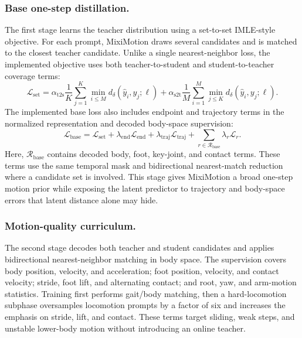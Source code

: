 \documentclass[runningheads]{llncs}
\begin{document}
\subsubsection{Base one-step distillation.}
The first stage learns the teacher distribution using a set-to-set IMLE-style
objective. For each prompt, MixiMotion draws several candidates and is matched
to the closest teacher candidate. Unlike a single nearest-neighbor loss, the
implemented objective uses both teacher-to-student and student-to-teacher
coverage terms:
\begin{equation}
  \mathcal{L}_{\mathrm{set}}
  = \alpha_{\mathrm{t2s}}\frac{1}{K}\sum_{j=1}^{K}
    \min_{i \le M} d_\delta(\hat{y}_i,y_j;\ell)
  + \alpha_{\mathrm{s2t}}\frac{1}{M}\sum_{i=1}^{M}
    \min_{j \le K} d_\delta(\hat{y}_i,y_j;\ell).
\end{equation}
The implemented base loss also includes endpoint and trajectory terms in the
normalized representation and decoded body-space supervision:
\begin{equation}
  \mathcal{L}_{\mathrm{base}}
  = \mathcal{L}_{\mathrm{set}}
  + \lambda_{\mathrm{end}}\mathcal{L}_{\mathrm{end}}
  + \lambda_{\mathrm{traj}}\mathcal{L}_{\mathrm{traj}}
  + \sum_{r\in\mathcal{R}_{\mathrm{base}}}\lambda_r\mathcal{L}_r .
\end{equation}
Here, $\mathcal{R}_{\mathrm{base}}$ contains decoded body, foot, key-joint, and
contact terms. These terms use the same temporal mask and bidirectional
nearest-match reduction where a candidate set is involved. This stage gives
MixiMotion a broad one-step motion prior while exposing the latent predictor
to trajectory and body-space errors that latent distance alone may hide.

\subsubsection{Motion-quality curriculum.}
The second stage decodes both teacher and student candidates and applies
bidirectional nearest-neighbor matching in body space. The supervision covers
body position, velocity, and acceleration; foot position, velocity, and
contact velocity; stride, foot lift, and alternating contact; and root, yaw,
and arm-motion statistics. Training first performs gait/body matching, then a
hard-locomotion subphase oversamples locomotion prompts by a factor of six and
increases the emphasis on stride, lift, and contact. These terms target
sliding, weak steps, and unstable lower-body motion without introducing an
online teacher.
\end{document}
